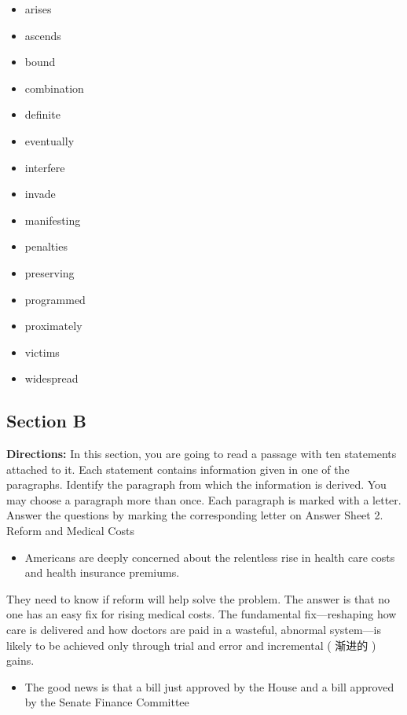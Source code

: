 \documentclass[UTF8,11pt]{ctexart}
\begin{document}
\begin{itemize}[leftmargin=2em,itemsep=.2em,topsep=.4em]\item[A.] arises
\item[B.] ascends
\item[C.] bound
\item[D.] combination
\item[E.] definite
\item[F.] eventually
\item[G.] interfere
\item[H.] invade
\item[I.] manifesting
\item[J.] penalties
\item[K.] preserving
\item[L.] programmed
\item[M.] proximately
\item[N.] victims
\item[O.] widespread
\end{itemize}

\subsection*{\textbf{Section B}}


\textbf{Directions:} In this section, you are going to read a passage with ten statements attached to it. Each statement contains information given in one of the paragraphs. Identify the paragraph from which the information is derived. You may choose a paragraph more than once. Each paragraph is marked with a letter. Answer the questions by marking the corresponding letter on Answer Sheet 2. Reform and Medical Costs


\begin{itemize}[leftmargin=2em,itemsep=.2em,topsep=.4em]\item[A.] Americans are deeply concerned about the relentless rise in health care costs and health insurance premiums.
\end{itemize}

They need to know if reform will help solve the problem. The answer is that no one has an easy fix for rising medical costs. The fundamental fix—reshaping how care is delivered and how doctors are paid in a wasteful, abnormal system—is likely to be achieved only through trial and error and incremental ( 渐进的 ) gains.


\begin{itemize}[leftmargin=2em,itemsep=.2em,topsep=.4em]\item[B.] The good news is that a bill just approved by the House and a bill approved by the Senate Finance Committee
\end{itemize}
\end{document}
